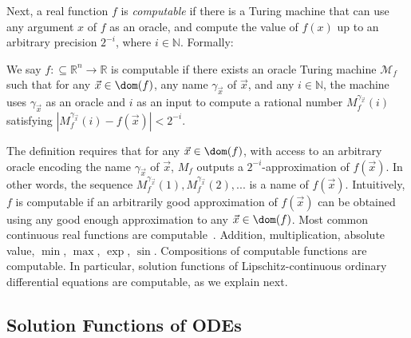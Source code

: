 \documentclass[11pt]{article}
\begin{document}
Next, a real function $f$ is {\em computable} if there is a Turing machine that can use any argument $x$ of $f$ as an oracle, and compute the value of $f(x)$ up to an arbitrary precision $2^{-i}$, where $i\in\mathbb{N}$. Formally: 
\begin{definition}\label{comp_functions}
We say $f:\subseteq\mathbb{R}^n\rightarrow \mathbb{R}$ is computable if there exists an oracle Turing machine $\mathcal{M}_f$ such that for any $\vec x\in \dom(f)$, any name $\gamma_{\vec x}$ of $\vec x$, and any $i\in \mathbb{N}$, the machine uses $\gamma_{\vec x}$ as an oracle and $i$ as an input to compute a rational number $M_f^{\gamma_{\vec x}}(i)$ satisfying $|M_f^{\gamma_{\vec x}}(i) - f(\vec x)|<2^{-i}.$
\end{definition}

The definition requires that for any $\vec x\in \dom(f)$, with access to an arbitrary oracle encoding the name $\gamma_{\vec x}$ of $\vec x$, $M_f$ outputs a $2^{-i}$-approximation of $f(\vec x)$. In other words, the sequence $M_f^{\gamma_{\vec x}}(1), M_f^{\gamma_{\vec x}}(2), ...$ is a name of $f(\vec x)$. Intuitively, $f$ is computable if an arbitrarily good approximation of $f(\vec x)$ can be obtained using any good enough approximation to any $\vec x\in\dom(f)$.
Most common continuous real functions are computable~\cite{CAbook}. Addition, multiplication, absolute value, $\min$, $\max$, $\exp$, $\sin$. Compositions of computable functions are computable. In particular, solution functions of Lipschitz-continuous ordinary differential equations are computable, as we explain next. 

\subsection{Solution Functions of ODEs}
\end{document}
